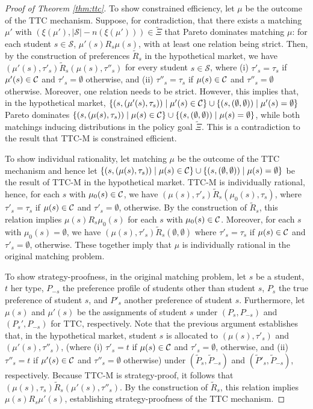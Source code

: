 \documentclass[12pt]{amsart}
\theoremstyle{remark}
\def\S{\mathcal{S}} \def\cals{\mathcal{S}}
\begin{document}
\begin{proof}[Proof of Theorem \ref{thm:ttc}]
To show constrained efficiency, let $\mu$ be the outcome of the TTC mechanism. Suppose, for contradiction, that there exists a matching $\mu'$ with $(\xi(\mu'),|\mathcal S|- n(\xi(\mu'))) \in \tilde{\Xi}$ that Pareto dominates matching $\mu$: for each student $s \in \S$, $\mu'(s) \mathrel{R_s} \mu(s)$, with at least one relation being strict. Then, by the construction of preferences $\mathrel{\tilde R_s}$ in the hypothetical market, we have $(\mu'(s), \tau'_s) \mathrel{\tilde R_s} (\mu(s),\tau''_s)$ for every student $s \in \S$, where (i) $\tau'_s=\tau_s$ if $\mu'(s) \in \mathcal{C}$ and $\tau'_s=\emptyset$ otherwise, and (ii) $\tau''_s=\tau_s$ if $\mu(s) \in \mathcal{C}$ and $\tau''_s=\emptyset$ otherwise. Moreover, one relation needs to be strict. However, this implies that, in the hypothetical market, $\{(s,(\mu'(s),\tau_s))\mid\mu'(s) \in \mathcal{C}\} \cup \{(s, (\emptyset,\emptyset)) \mid \mu'(s) = \emptyset \}$ Pareto dominates $\{(s,(\mu(s),\tau_s))\mid\mu(s) \in \mathcal{C}\} \cup \{(s, (\emptyset,\emptyset)) \mid \mu(s) = \emptyset \}$, while both matchings inducing distributions in the policy goal $\tilde \Xi$. This is a contradiction to the result that TTC-M is constrained efficient.

To show individual rationality, let matching $\mu$ be the outcome of the TTC mechanism and hence let $\{(s,(\mu(s),\tau_s))\mid\mu(s) \in \mathcal{C}\} \cup \{(s, (\emptyset,\emptyset)) \mid \mu(s) = \emptyset \}$ be the result of TTC-M in the hypothetical market.  TTC-M is individually rational, hence, for each $s$ with $\mu_0(s) \in \mathcal{C}$, we have $(\mu(s), \tau'_s) \mathrel{\tilde R_s} (\mu_0(s), \tau_s)$, where $\tau'_s=\tau_s$ if $\mu(s) \in \mathcal{C}$ and $\tau'_s=\emptyset$, otherwise. By the construction of $\tilde R_s$, this relation implies  $\mu(s) \mathrel{R_s} \mu_0(s)$ for each $s$ with $\mu_0(s) \in \mathcal{C}$. Moreover, for each $s$ with $\mu_0(s) = \emptyset$, we have $(\mu(s), \tau'_s) \mathrel{\tilde R_s} (\emptyset,\emptyset)$ where $\tau'_s=\tau_s$ if $\mu(s) \in \mathcal{C}$ and $\tau'_s=\emptyset$, otherwise. These together imply that $\mu$ is individually rational in the original matching problem.

To show strategy-proofness, in the original matching problem, let $s$ be a student, $t$ her type, $P_{-s}$ the preference profile of students other than student $s$,
$P_s$ the true preference of student $s$, and $P'_s$ another preference of student $s.$ Furthermore, let $\mu(s)$ and $\mu'(s)$ be the assignments of student $s$
under $(P_s,P_{-s})$ and $(P_s',P_{-s})$ for TTC, respectively. Note that the previous argument establishes that, in the hypothetical market,
student $s$ is allocated to $(\mu(s),\tau'_s)$ and $(\mu'(s),\tau''_s)$, (where (i) $\tau'_s=t$ if $\mu(s) \in \mathcal{C}$ and $\tau'_s=\emptyset$, otherwise, and
(ii) $\tau''_s=t$ if $\mu'(s) \in \mathcal{C}$ and $\tau''_s=\emptyset$ otherwise) under $(\tilde P_s, \tilde P_{-s})$ and $(\tilde P'_s, \tilde P_{-s})$, respectively.
Because TTC-M is strategy-proof, it follows that $(\mu(s),\tau_s) \mathrel{\tilde R_s} (\mu'(s),\tau''_s)$. By the construction of $\tilde R_s$, this relation implies $\mu(s) \mathrel{R_s} \mu'(s)$, establishing strategy-proofness of the TTC mechanism.
\end{proof}
\medskip
\end{document}
